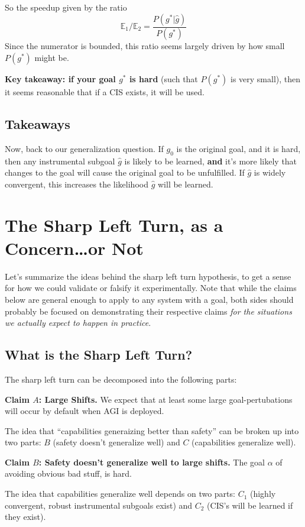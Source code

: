 \documentclass{article}
\begin{document}
So the speedup given by the ratio
\[
\mathbb{E}_1 / \mathbb{E}_2 = \frac{P(g^*|\hat{g})}{P(g^*)}
\]
Since the numerator is bounded, this ratio seems largely driven by how small $P(g^*)$ might be.

\textbf{Key takeaway: if your goal $g^*$ is hard} (such that $P(g^*)$ is very small), then it seems reasonable that if a CIS exists, it will be used.

\subsection{Takeaways}
Now, back to our generalization question. If $g_0$ is the original goal, and it is hard, then any instrumental subgoal $\hat{g}$ is likely to be learned, \textbf{and} it's more likely that changes to the goal will cause the original goal to be unfulfilled. If $\hat{g}$ is widely convergent, this increases the likelihood $\hat{g}$ will be learned.

\section{The Sharp Left Turn, as a Concern\ldots or Not}
Let's summarize the ideas behind the sharp left turn hypothesis, to get a sense for how we could validate or falsify it experimentally. Note that while the claims below are general enough to apply to any system with a goal, both sides should probably be focused on demonstrating their respective claims \emph{for the situations we actually expect to happen in practice}. 

\subsection{What is the Sharp Left Turn?} 
The sharp left turn can be decomposed into the following parts:

\textbf{Claim $A$: Large Shifts.} We expect that at least some large goal-pertubations will occur by default when AGI is deployed.

The idea that ``capabilities generaizing better than safety'' can be broken up into two parts: \textbf{$B$} (safety doesn't generalize well) and \textbf{$C$} (capabilities generalize well).

\textbf{Claim $B$: Safety doesn't generalize well to large shifts.} The goal $\alpha$ of avoiding obvious bad stuff, is hard. 

The idea that capabilities generalize well depends on two parts: \textbf{$C_1$} (highly convergent, robust instrumental subgoals exist) and \textbf{$C_2$} (CIS's will be learned if they exist).
\end{document}
